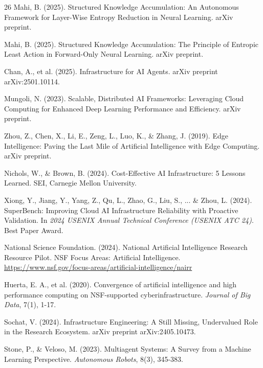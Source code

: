 \documentclass[11pt]{article}
\begin{document}
	\begin{thebibliography}{26}
		Mahi, B. (2025). Structured Knowledge Accumulation:  An Autonomous Framework for Layer-Wise Entropy Reduction in Neural Learning. arXiv preprint.
		
		Mahi, B. (2025). Structured Knowledge Accumulation: The Principle of Entropic Least Action in Forward-Only Neural Learning. arXiv preprint.
		
		Chan, A., et al. (2025). Infrastructure for AI Agents. arXiv preprint arXiv:2501.10114.
		
		Mungoli, N. (2023). Scalable, Distributed AI Frameworks: Leveraging Cloud Computing for Enhanced Deep Learning Performance and Efficiency. arXiv preprint.
		
		Zhou, Z., Chen, X., Li, E., Zeng, L., Luo, K., \& Zhang, J. (2019). Edge Intelligence: Paving the Last Mile of Artificial Intelligence with Edge Computing. arXiv preprint.
		
		Nichols, W., \& Brown, B. (2024). Cost-Effective AI Infrastructure: 5 Lessons Learned. SEI, Carnegie Mellon University.
		
		Xiong, Y., Jiang, Y., Yang, Z., Qu, L., Zhao, G., Liu, S., ... \& Zhou, L. (2024). SuperBench: Improving Cloud AI Infrastructure Reliability with Proactive Validation. In \textit{2024 USENIX Annual Technical Conference (USENIX ATC 24)}. Best Paper Award.
		
		National Science Foundation. (2024). National Artificial Intelligence Research Resource Pilot. NSF Focus Areas: Artificial Intelligence. \url{https://www.nsf.gov/focus-areas/artificial-intelligence/nairr}
		
		Huerta, E. A., et al. (2020). Convergence of artificial intelligence and high performance computing on NSF-supported cyberinfrastructure. \textit{Journal of Big Data}, 7(1), 1-17.
		
		Sochat, V. (2024). Infrastructure Engineering: A Still Missing, Undervalued Role in the Research Ecosystem. arXiv preprint arXiv:2405.10473.
		
		Stone, P., \& Veloso, M. (2023). Multiagent Systems: A Survey from a Machine Learning Perspective. \textit{Autonomous Robots}, 8(3), 345-383.
		

\end{thebibliography}
\end{document}
